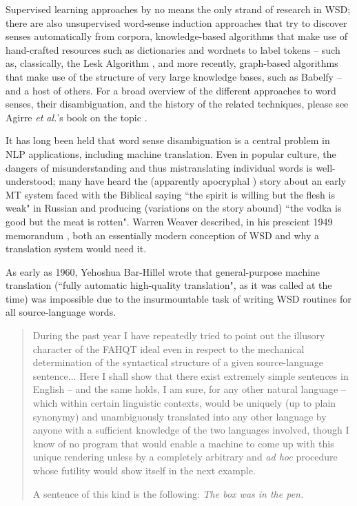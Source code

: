 Supervised learning approaches by no means the only strand of research in WSD;
there are also unsupervised word-sense induction approaches that try to
discover senses automatically from corpora, knowledge-based algorithms that
make use of hand-crafted resources such as dictionaries and wordnets to label
tokens -- such as, classically, the Lesk Algorithm \cite{lesk}, and more
recently, graph-based algorithms that make use of the structure of very large
knowledge bases, such as Babelfy \cite{moro2014entity} -- and a host of others.
For a broad overview of the different approaches to word senses, their
disambiguation, and the history of the related techniques, please see Agirre
\emph{et al.}'s book on the topic \cite{agirre2006word}.

It has long been held that word sense disambiguation is a central problem in
NLP applications, including machine translation.
Even in popular culture, the dangers of misunderstanding and thus
mistranslating individual words is well-understood; many have heard the
(apparently apocryphal \cite{hutchins:whiskey}) story about an early MT system
faced with the Biblical saying ``the spirit is willing but the flesh is
weak" in Russian and producing (variations on the story abound) ``the vodka is
good but the meat is rotten".
Warren Weaver described, in his prescient 1949 memorandum \cite{weavermemo},
both an essentially modern conception of WSD and why a translation system would
need it.

As early as 1960, Yehoshua Bar-Hillel wrote that general-purpose machine
translation (``fully automatic high-quality  translation", as it was  called at
the  time) was impossible due to the insurmountable task of writing WSD
routines for all source-language words. \cite{barhillel1960}

\begin{quote}
During the past year I have repeatedly tried to point out the illusory
character of the FAHQT ideal even in respect to the mechanical determination of
the syntactical structure of a given source-language sentence... Here I shall
show that there exist extremely simple sentences in English -- and the same
holds, I am sure, for any other natural language -- which within certain
linguistic contexts, would be uniquely (up to plain synonymy) and unambiguously
translated into any other language by anyone with a sufficient knowledge of the
two languages involved, though I know of no program that would enable a machine
to come up with this unique rendering unless by a completely arbitrary and
\emph{ad hoc} procedure whose futility would show itself in the next example.

A sentence of this kind is the following: \emph{The box was in the pen.}
\end{quote}

